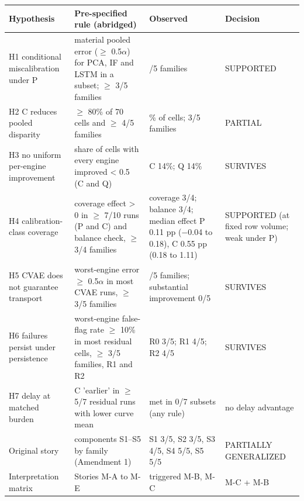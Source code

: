\begin{tabular}{>{\raggedright\arraybackslash}p{}>{\raggedright\arraybackslash}p{}>{\raggedright\arraybackslash}p{}>{\raggedright\arraybackslash}p{}}
\toprule
Hypothesis & Pre-specified rule (abridged) & Observed & Decision \\
\midrule
H1 conditional miscalibration under P & material pooled error ($\geq$ 0.5$\alpha$) for PCA, IF and LSTM in a subset; $\geq$ 3/5 families & 3/5 families & SUPPORTED \\
H2 C reduces pooled disparity & $\geq$ 80\% of 70 cells and $\geq$ 4/5 families & 66\% of cells; 3/5 families & PARTIAL \\
H3 no uniform per-engine improvement & share of cells with every engine improved < 0.5 (C and Q) & C 14\%; Q 14\% & SURVIVES \\
H4 calibration-class coverage & coverage effect > 0 in $\geq$ 7/10 runs (P and C) and balance check, $\geq$ 3/4 families & coverage 3/4; balance 3/4; median effect P 0.11 pp ($-$0.04 to 0.18), C 0.55 pp (0.18 to 1.11) & SUPPORTED (at fixed row volume; weak under P) \\
H5 CVAE does not guarantee transport & worst-engine error $\geq$ 0.5$\alpha$ in most CVAE runs, $\geq$ 3/5 families & 5/5 families; substantial improvement 0/5 & SURVIVES \\
H6 failures persist under persistence & worst-engine false-flag rate $\geq$ 10\% in most residual cells, $\geq$ 3/5 families, R1 and R2 & R0 3/5; R1 4/5; R2 4/5 & SURVIVES \\
H7 delay at matched burden & C 'earlier' in $\geq$ 5/7 residual runs with lower curve mean & met in 0/7 subsets (any rule) & no delay advantage \\
Original story & components S1--S5 by family (Amendment 1) & S1 3/5, S2 3/5, S3 4/5, S4 5/5, S5 5/5 & PARTIALLY GENERALIZED \\
Interpretation matrix & Stories M-A to M-E & triggered M-B, M-C & M-C + M-B \\
\bottomrule
\end{tabular}
